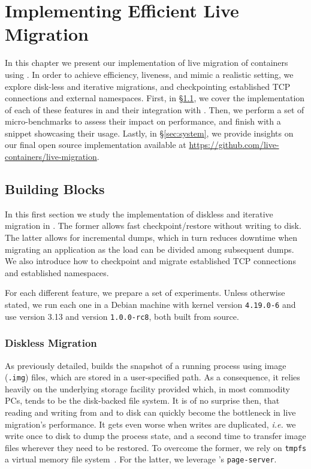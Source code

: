 \chapter{Implementing Efficient Live Migration} \label{chap:system}

In this chapter we present our implementation of live migration of \runc containers using \criu.
In order to achieve efficiency, liveness, and mimic a realistic setting, we explore disk-less and iterative migrations, and checkpointing established TCP connections and external namespaces.
First, in \S\ref{sec:arch-blocks}, we cover the implementation of each of these features in \criu and their integration with \runc.
Then, we perform a set of micro-benchmarks to assess their impact on performance, and finish with a snippet showcasing their usage.
Lastly, in \S\ref{sec:system}, we provide insights on our final open source implementation available at \url{https://github.com/live-containers/live-migration}.

\section{Building Blocks} \label{sec:arch-blocks}

In this first section we study the implementation of diskless and iterative migration in \criu.
The former allows fast checkpoint/restore without writing to disk.
The latter allows for incremental dumps, which in turn reduces downtime when migrating an application as the load can be divided among subsequent dumps.
We also introduce how to checkpoint and migrate established TCP connections and established namespaces.

For each different feature, we prepare a set of experiments.
Unless otherwise stated, we run each one in a Debian machine with kernel version \texttt{4.19.0-6} and use \criu version 3.13 and \runc version \texttt{1.0.0-rc8}, both built from source.

\subsection{Diskless Migration}

As previously detailed, \criu builds the snapshot of a running process using image (\texttt{.img}) files, which are stored in a user-specified path.
As a consequence, it relies heavily on the underlying storage facility provided which, in most commodity PCs, tends to be the disk-backed file system.
It is of no surprise then, that reading and writing from and to disk can quickly become the bottleneck in live migration's performance.
It gets even worse when writes are duplicated, \textit{i.e.} we write once to disk to dump the process state, and a second time to transfer image files wherever they need to be restored.
To overcome the former, we rely on \texttt{tmpfs} a virtual memory file system~\cite{tmpfs-manpage}.
For the latter, we leverage \criu's \texttt{page-server}.

